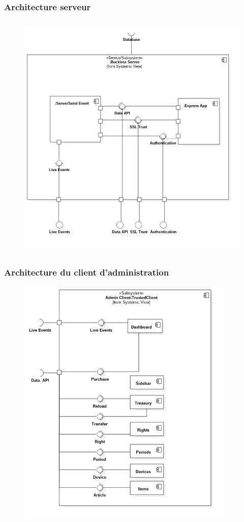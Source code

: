     \newpage
    \subsubsection{Architecture serveur}
        \begin{figure}[h]
            \centering
            \includegraphics[height=12cm]{./assets/UML/buckless_server.png}
        \end{figure}

    \newpage
    \subsubsection{Architecture du client d'administration}
        \begin{figure}[h]
            \centering
            \includegraphics[height=12cm]{./assets/UML/admin_client.png}
        \end{figure}

